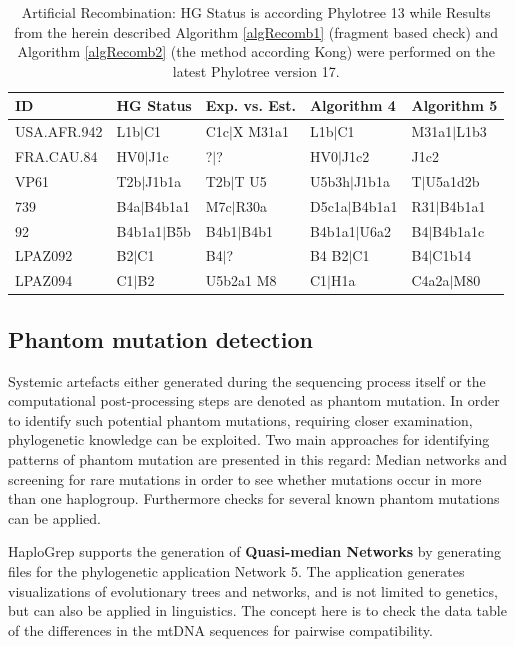 \begin{table}[H]
\centering

\begin{tabular}{lllll}
ID & HG Status & Exp. vs. Est. & Algorithm 4 & Algorithm 5\\ \midrule
USA.AFR.942 & L1b$|$C1 & C1c$|$X M31a1 & L1b$|$C1 &  M31a1$|$L1b3 \\
FRA.CAU.84 & HV0$|$J1c & ?$|$? & HV0$|$J1c2 & J1c2 \\
VP61 & T2b$|$J1b1a & T2b$|$T U5 & U5b3h$|$J1b1a & T$|$U5a1d2b \\
739 & B4a$|$B4b1a1 & M7c$|$R30a & D5c1a$|$B4b1a1 & R31$|$B4b1a1 \\
92 & B4b1a1$|$B5b & B4b1$|$B4b1& B4b1a1$|$U6a2 & B4$|$B4b1a1c \\
LPAZ092 & B2$|$C1 & B4$|$?& B4 B2$|$C1 & B4$|$C1b14 \\
LPAZ094 & C1$|$B2&U5b2a1 M8& C1$|$H1a & C4a2a$|$M80 
\end{tabular}
\caption{Artificial Recombination: HG Status is according Phylotree 13 while Results from the herein described Algorithm   \ref{algRecomb1} (fragment based check) and Algorithm \ref{algRecomb2} (the method according Kong) were performed on the latest Phylotree version 17.}
\label{table:recomb}
\end{table}

\subsection{Phantom mutation detection}
\label{hg:phantom}
Systemic artefacts either generated during the sequencing process itself or the computational post-processing steps are denoted as phantom mutation. In order to identify such potential phantom mutations, requiring closer examination, phylogenetic knowledge can be exploited. Two main approaches for identifying patterns of phantom mutation are presented in this regard: Median networks and screening for rare mutations in order to see whether mutations occur in more than one haplogroup. Furthermore checks for several known phantom mutations can be applied. 

HaploGrep supports the generation of \textbf{Quasi-median Networks} by generating files for the phylogenetic application Network 5. The application generates visualizations of evolutionary trees and networks, and is not limited to genetics, but can also be applied in linguistics. The concept here is to check the data table of the differences in the mtDNA sequences for pairwise compatibility. 


